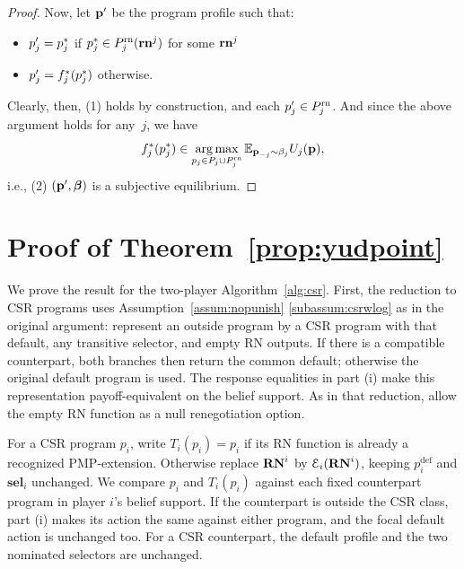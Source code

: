 \documentclass[sigconf]{aamas}
\newcommand{\selection}{sel}%
\newcommand{\renegb}{\mathbf{\selection}}
\theoremstyle{definition}
\begin{document}
\begin{proof}
Now, let $\textbf{p}'$ be the program profile such that:
\begin{itemize}
    \item $p_j' = p_j^*$ if $p_j^* \in P_j^{\textnormal{rn}}(\mathbf{rn}^j)$ for some $\mathbf{rn}^j$
    \item $p_j' = f_j^*(p_j^*)$ otherwise.
\end{itemize}

Clearly, then, (1) holds by construction, and each $p_j' \in P_j^{\textnormal{rn}}$. 
And since the above argument holds for any~$j$,
we have
$$f_j^*(p_j^*) \in \operatorname*{arg\,max}_{p_j \in P_j \cup P_j^{\textnormal{rn}}}
\mathbb{E}_{\textbf{p}_{-j} \sim \beta_j} U_j(\textbf{p}),$$
i.e., (2) $(\textbf{p}', \boldsymbol{\beta})$ is a subjective equilibrium.
\end{proof}



\section{Proof of Theorem~\ref{prop:yudpoint}}
\label{app:conditional-pmp-proof}

We prove the result for the two-player Algorithm~\ref{alg:csr}. First,
the reduction to CSR programs uses Assumption~\ref{assum:nopunish}
\ref{subassum:csrwlog} as in the original argument: represent an outside
program by a CSR program with that default, any transitive selector,
and empty RN outputs. If there is a compatible counterpart, both
branches then return the common default; otherwise the original default
program is used. The response equalities in part (i) make this
representation payoff-equivalent on the belief support. As in that
reduction, allow the empty RN function as a null renegotiation option.

For a CSR program $p_i$, write $T_i(p_i)=p_i$ if its RN function is
already a recognized PMP-extension. Otherwise replace $\mathbf{RN}^{i}$ by
$\mathcal E_i(\mathbf{RN}^{i})$, keeping $p_i^{\mathrm{def}}$ and $\renegb_i$
unchanged. We compare $p_i$ and $T_i(p_i)$ against each fixed counterpart
program in player $i$'s belief support. If the counterpart is outside
the CSR class, part (i) makes its action the same against either program,
and the focal default action is unchanged too. For a CSR counterpart,
the default profile and the two nominated selectors are unchanged.
\end{document}
